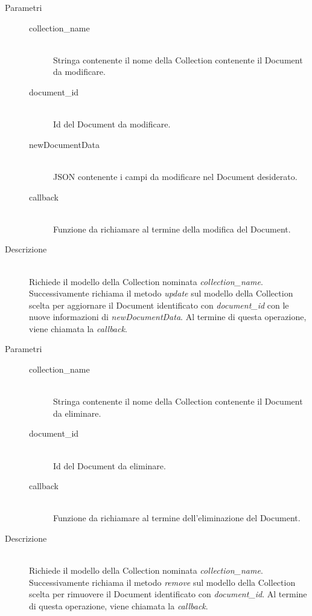 \begin{description}
\begin{mldescription}
	 \hfill
		\begin{description}
			\item[Parametri] \hfill
				\begin{description}
					\item[collection\_name] \hfill \\
					Stringa contenente il nome della Collection contenente il Document da modificare.
					\item[document\_id] \hfill \\
					Id del Document da modificare.
					\item[newDocumentData] \hfill \\
					JSON contenente i campi da modificare nel Document desiderato.					
					\item[callback] \hfill \\
					Funzione da richiamare al termine della modifica del Document.
				\end{description}
			\item[Descrizione] \hfill \\
			Richiede il modello della Collection nominata \textit{collection\_name}. Successivamente richiama il metodo \textit{update} sul modello della Collection scelta per aggiornare il Document identificato con \textit{document\_id} con le nuove informazioni di \textit{newDocumentData}. Al termine di questa operazione, viene chiamata la \textit{callback}.
		\end{description}
	
	 \hfill 
		\begin{description}
			\item[Parametri] \hfill
				\begin{description}
					\item[collection\_name] \hfill \\
					Stringa contenente il nome della Collection contenente il Document da eliminare.
					\item[document\_id] \hfill \\
					Id del Document da eliminare.
					\item[callback] \hfill \\
					Funzione da richiamare al termine dell'eliminazione del Document.
				\end{description}
			\item[Descrizione] \hfill \\
Richiede il modello della Collection nominata \textit{collection\_name}. Successivamente richiama
il metodo \textit{remove} sul modello della Collection scelta per rimuovere il Document identificato con \textit{document\_id}. Al termine di questa 	operazione, viene chiamata la \textit{callback}.
		\end{description}
		
\end{mldescription}

\end{description}

